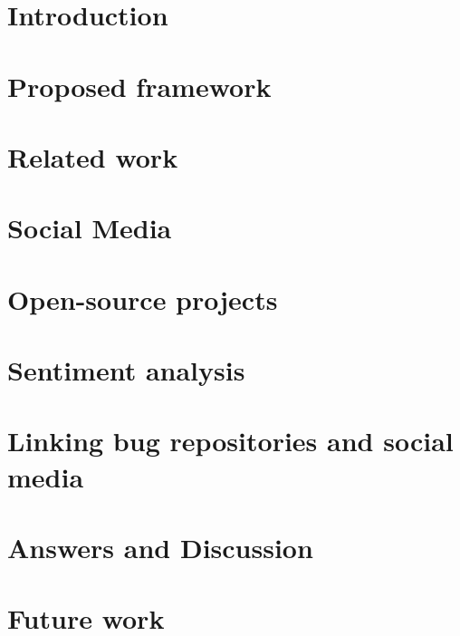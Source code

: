\documentclass[a4paper,11pt,pdftex,halfparskip,cleardoubleempty]{scrbook}
\begin{document}

\cleardoublepage

{\renewcommand{\addtocontents}[2]{}
\chapter*{}

}%

\tableofcontents 
\cleardoublepage
{}
\pagestyle{plain} 

\chapter{Introduction}
\label{chp:introduction}

 
 
\chapter{Proposed framework}
\label{chap:proposedFramework}


\chapter{Related work}
\label{chap:relatedWork}


\chapter{Social Media}
\label{chap:socialMedia}



\chapter{Open-source projects}
\label{chap:ossProjects}



\chapter{Sentiment analysis}
\label{chap:sentimentAnalysis}


\chapter{Linking bug repositories and social media}
\label{chap:pairingBugs}


\chapter{Answers and Discussion}
\label{chap:discussion}


\chapter{Future work}
\label{chap:futureWork}


\label{sec:introduction}


\newpage
\nocite{*}


\end{document}
